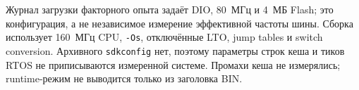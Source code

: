 Журнал загрузки факторного опыта задаёт DIO, 80~МГц и 4~МБ Flash; это конфигурация, а не независимое измерение эффективной частоты шины. Сборка использует 160~МГц CPU, \texttt{-Os}, отключённые LTO, jump tables и switch conversion. Архивного \texttt{sdkconfig} нет, поэтому параметры строк кеша и тиков RTOS не приписываются измеренной системе. Промахи кеша не измерялись; runtime-режим не выводится только из заголовка BIN.

